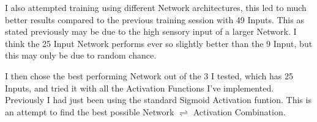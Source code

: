 \begin{flushleft}
        I also attempted training using different Network architectures, this led to much better results compared to the previous training session with 49 Inputs.
        This as stated previously may be due to the high sensory input of a larger Network. I think the 25 Input Network performs ever so slightly better than
        the 9 Input, but this may only be due to random chance.

        \begin{figure}[H]
            \centering
            \qquad
        \end{figure}

        I then chose the best performing Network out of the 3 I tested, which has 25 Inputs, and tried it with all the Activation Functions I've implemented. Previously
        I had just been using the standard Sigmoid Activation funtion. This is an attempt to find the best possible Network $\rightleftharpoons$ Activation Combination.


\end{flushleft}
